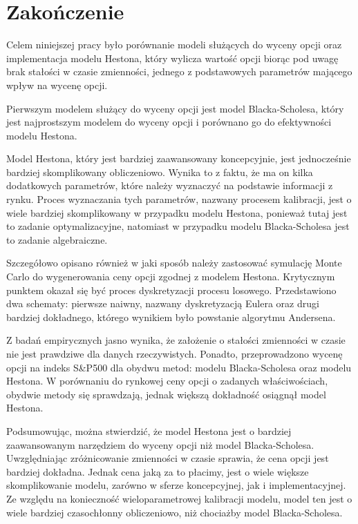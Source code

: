 \documentclass{pracamgr}
\begin{document}
 \chapter*{Zakończenie}\label{r:ending}

Celem niniejszej pracy było porównanie modeli służących do wyceny
opcji oraz implementacja modelu Hestona, który wylicza wartość opcji biorąc
pod uwagę brak stałości w czasie zmienności, jednego z podstawowych parametrów
mającego wpływ na wycenę opcji. 

Pierwszym modelem służący do wyceny opcji jest model Blacka-Scholesa, który jest
najprostszym modelem do wyceny opcji i porównano go do efektywności modelu 
Hestona. 

Model Hestona, który jest bardziej zaawansowany koncepcyjnie, jest jednocześnie 
bardziej skomplikowany obliczeniowo. Wynika to z faktu, że ma on kilka dodatkowych
parametrów, które należy wyznaczyć na podstawie informacji z rynku. Proces wyznaczania tych 
parametrów, nazwany procesem kalibracji, jest o wiele bardziej skomplikowany w przypadku 
modelu Hestona, ponieważ tutaj jest to zadanie optymalizacyjne, natomiast w przypadku modelu
Blacka-Scholesa jest to zadanie algebraiczne.

Szczegółowo opisano również w jaki sposób należy zastosować symulację Monte Carlo do 
wygenerowania ceny opcji zgodnej z modelem Hestona. Krytycznym punktem okazał się być
proces dyskretyzacji procesu losowego. Przedstawiono dwa schematy: pierwsze naiwny, nazwany
dyskretyzacją Eulera oraz drugi bardziej dokładnego, którego wynikiem było powstanie 
algorytmu Andersena. 

Z badań empirycznych jasno wynika, że założenie o stałości zmienności w czasie nie jest 
prawdziwe dla danych rzeczywistych. Ponadto, przeprowadzono wycenę opcji na indeks 
S\&P500 dla obydwu metod: modelu Blacka-Scholesa oraz modelu Hestona. 
W porównaniu do rynkowej ceny opcji o zadanych właściwościach, obydwie metody się 
sprawdzają, jednak większą dokładność osiągnął model Hestona.


Podsumowując, można stwierdzić, że model Hestona jest o bardziej zaawansowanym
narzędziem do wyceny opcji niż model Blacka-Scholesa. Uwzględniając zróżnicowanie zmienności 
w czasie sprawia, że cena opcji jest bardziej dokładna. Jednak cena jaką za to płacimy,
jest o wiele większe skomplikowanie modelu, zarówno w sferze koncepcyjnej, jak i 
implementacyjnej. Ze względu na konieczność wieloparametrowej kalibracji modelu, 
model ten jest o wiele bardziej czasochłonny obliczeniowo, niż chociażby model Blacka-Scholesa.


\appendix

\listoffigures 
{} 
 
\listoflistings
\printbibliography
\printindex 
\end{document}
